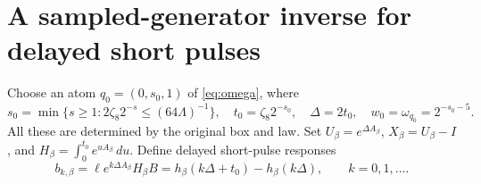 \section{A sampled-generator inverse for delayed short pulses}
\label{sec:sampled}
Choose an atom $q_0=(0,s_0,1)$ of \eqref{eq:omega}, where
\begin{equation}
 s_0=\min\{s\ge1:2\zeta_8 2^{-s}\le(64\Lambda)^{-1}\},\quad
 t_0=\zeta_8 2^{-s_0},\quad\Delta=2t_0,\quad w_0=\omega_{q_0}=2^{-s_0-5}.
 \label{eq:fast-atom}
\end{equation}
All these are determined by the original box and law. Set
$U_\beta=e^{\Delta A_\beta}$, $X_\beta=U_\beta-I$, and
$H_\beta=\int_0^{t_0}e^{uA_\beta}\,du$. Define delayed short-pulse responses
\begin{equation}
 b_{k,\beta}=\ell e^{k\Delta A_\beta}H_\beta B
      =h_\beta(k\Delta+t_0)-h_\beta(k\Delta),\qquad k=0,1,\ldots.
 \label{eq:pulse-responses}
\end{equation}

